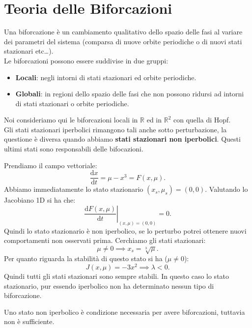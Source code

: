 \section{Teoria delle Biforcazioni}%
Una biforcazione è un cambiamento qualitativo dello spazio delle fasi al variare dei parametri del sistema (comparsa di nuove orbite periodiche o di nuovi stati stazionari etc\ldots).\\
Le biforcazioni possono essere suddivise in due gruppi:
\begin{itemize}
    \item \textbf{Locali}: negli intorni di stati stazionari ed orbite periodiche.
    \item \textbf{Globali}: in regioni dello spazio delle fasi che non possono ridursi ad intorni di stati stazionari o orbite periodiche.
\end{itemize}
Noi consideriamo qui le biforcazioni locali in $\mathbb{R}$ ed in $\mathbb{R}^2$ con quella di Hopf.\\
Gli stati stazionari iperbolici rimangono tali anche sotto perturbazione, la questione è diversa quando abbiamo \textbf{stati stazionari non iperbolici}. 
Questi ultimi stati sono responsabili delle bifocazioni.
\begin{exmp}
    Prendiamo il campo vettoriale:
    \[
	\frac{\text{d} x}{\text{d} t} = \mu-x^3=F(x, \mu) 
    .\] 
    Abbiamo immediatamente lo stato stazionario $(x_s, \mu_s) = (0, 0)$. Valutando lo Jacobiano 1D si ha che:
    \[
	\left.\frac{\text{d} F(x, \mu) }{\text{d} t} \right|_{(x, \mu) = (0,0)}=0
    .\] 
    Quindi lo stato stazionario è non iperbolico, se lo perturbo potrei ottenere nuovi comportamenti non osservati prima. Cerchiamo gli stati stazionari:
    \[
	\mu\neq 0\implies x_s = \sqrt[3]{\mu} 
    .\] 
    Per quanto riguarda la stabilità di questo stato si ha ($\mu\neq 0$):
    \[
	J(x, \mu) = -3x^2 \implies  \lambda  < 0
    .\] 
    Quindi tutti gli stati stazionari sono sempre stabili. In questo caso lo stato stazionario, pur essendo iperbolico non ha determinato nessun tipo di biforcazione.
\end{exmp}
\noindent
Uno stato non iperbolico è condizione necessaria per avere biforcazioni, tuttavia non è sufficiente.
